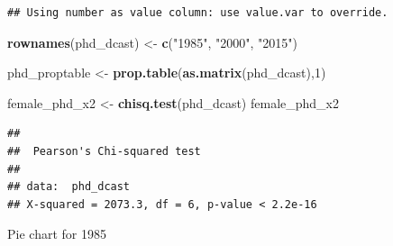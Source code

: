 \documentclass[]{article}
\newenvironment{Shaded}{\begin{snugshade}}{\end{snugshade}}
\newcommand{\KeywordTok}[1]{\textcolor[rgb]{0.13,0.29,0.53}{\textbf{#1}}}
\newcommand{\DecValTok}[1]{\textcolor[rgb]{0.00,0.00,0.81}{#1}}
\newcommand{\StringTok}[1]{\textcolor[rgb]{0.31,0.60,0.02}{#1}}
\newcommand{\NormalTok}[1]{#1}
\begin{document}
\begin{verbatim}
## Using number as value column: use value.var to override.
\end{verbatim}

\begin{Shaded}
\begin{Highlighting}[]
\KeywordTok{rownames}\NormalTok{(phd_dcast) <-}\StringTok{ }\KeywordTok{c}\NormalTok{(}\StringTok{"1985"}\NormalTok{, }\StringTok{"2000"}\NormalTok{, }\StringTok{"2015"}\NormalTok{)}

\NormalTok{phd_proptable <-}\StringTok{ }\KeywordTok{prop.table}\NormalTok{(}\KeywordTok{as.matrix}\NormalTok{(phd_dcast),}\DecValTok{1}\NormalTok{)}

\NormalTok{female_phd_x2 <-}\StringTok{ }\KeywordTok{chisq.test}\NormalTok{(phd_dcast)}
\NormalTok{female_phd_x2}
\end{Highlighting}
\end{Shaded}

\begin{verbatim}
## 
##  Pearson's Chi-squared test
## 
## data:  phd_dcast
## X-squared = 2073.3, df = 6, p-value < 2.2e-16
\end{verbatim}

Pie chart for 1985
\end{document}
